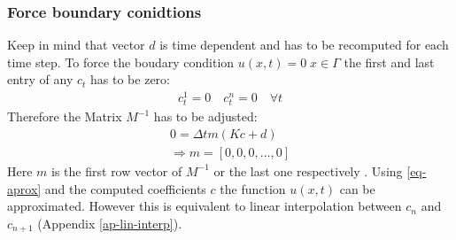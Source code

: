 \subsubsection{Force boundary conidtions}
Keep in mind that vector \(d\) is time dependent and has to be recomputed for each time step.
To force the boudary condition \(u(x, t) = 0 \; x \in \Gamma\) the first and last entry of any \(c_{t}\) has to be zero:
\begin{gather}
c_{t}^{1} = 0 \quad c_{t}^{n} = 0 \quad \forall t
\end{gather}
Therefore the Matrix \(M^{-1}\) has to be adjusted:
\begin{gather}
0 = \Delta t m (Kc + d) \\
\Rightarrow m = [0, 0, 0, \dots , 0] \label{force-bound}
\end{gather}
Here \(m\) is the first row vector of \(M^{-1}\) or the last one respectively \cite{Gustafsson2011b}.
Using \ref{eq-aprox} and the computed coefficients \(c\) the function \(u(x,t)\) can be approximated.
However this is equivalent to linear interpolation between \(c_{n}\) and \(c_{n+1}\) (Appendix \ref{ap-lin-interp}).